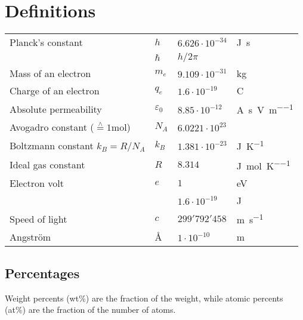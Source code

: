 \section{Definitions}

\begin{tabularx}{\linewidth}{Xlll}

	Planck's constant & $h$ & $6.626 \cdot 10^{-34}$ & \si{\J\second} \\
		& $\hbar$ & $h / 2\pi$ & \\
	Mass of an electron & $m_e$ &  $9.109 \cdot 10^{-31}$ & \si{\kilogram} \\
	Charge of an electron & $q_e$ & $1.6 \cdot 10^{-19}$ & \si{\coulomb} \\
	Absolute permeability & $\varepsilon_0$ & $8.85 \cdot 10^{-12}$ & \si{\ampere\second\per\volt\per\meter} \\
	Avogadro constant  ($\stackrel{\wedge}{=}1$\si{\mol})& $N_A$ & $6.0221 \cdot 10^{23}$ & \\
	Boltzmann constant $k_B = R / N_A$& $k_B$ & $1.381 \cdot10^{-23}$ & \si{\J\per\K} \\
	Ideal gas constant & $R$ & $8.314$ & \si{\J\per\mol\per\K} \\
	Electron volt & $e$ & $1$ & \si{\eV} \\
		& & $1.6 \cdot 10^{-19}$ & \si{\J} \\ 
	Speed of light & $c$ & $299'792'458$ & \si{\meter\per\second} \\
	Angström & \AA & $1 \cdot 10^{-10}$ & \si{\meter} \\
\end{tabularx}

\subsection{Percentages}
Weight percents (wt\%) are the fraction of the weight, while atomic percents (at\%) are the fraction of the number of atoms.